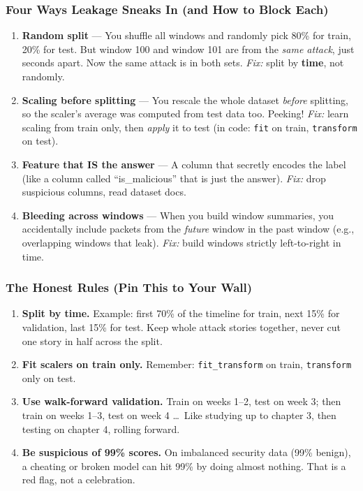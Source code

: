 \documentclass[11pt,a4paper]{article}
\begin{document}
\subsubsection{Four Ways Leakage Sneaks In (and How to Block Each)}

\begin{enumerate}[leftmargin=1.8em,itemsep=2pt]
  \item \textbf{Random split} --- You shuffle all windows and randomly pick
        80\% for train, 20\% for test. But window 100 and window 101 are from
the \emph{same attack}, just seconds apart. Now the same attack is in
both sets. \emph{Fix:} split by \textbf{time}, not randomly.

  \item \textbf{Scaling before splitting} --- You rescale the whole dataset
        \emph{before} splitting, so the scaler's average was computed from test
data too. Peeking! \emph{Fix:} learn scaling from train only, then
\emph{apply} it to test (in code: \texttt{fit} on train,
\texttt{transform} on test).

  \item \textbf{Feature that IS the answer} --- A column that secretly encodes
the label (like a column called ``is\_malicious'' that is just the
answer). \emph{Fix:} drop suspicious columns, read dataset docs.

  \item \textbf{Bleeding across windows} --- When you build window summaries,
you accidentally include packets from the \emph{future} window in the
past window (e.g., overlapping windows that leak). \emph{Fix:} build
windows strictly left-to-right in time.
\end{enumerate}

\subsubsection{The Honest Rules (Pin This to Your Wall)}

\begin{enumerate}[leftmargin=1.8em,itemsep=2pt]
  \item \textbf{Split by time.} Example: first 70\% of the timeline for train,
        next 15\% for validation, last 15\% for test. Keep whole attack stories
together, never cut one story in half across the split.
  \item \textbf{Fit scalers on train only.} Remember: \texttt{fit\_transform}
on train, \texttt{transform} only on test.
  \item \textbf{Use walk-forward validation.} Train on weeks 1--2, test on week
3; then train on weeks 1--3, test on week 4 \dots\ Like studying up to
chapter 3, then testing on chapter 4, rolling forward.
  \item \textbf{Be suspicious of 99\% scores.} On imbalanced security data
(99\% benign), a cheating or broken model can hit 99\% by doing almost
nothing. That is a red flag, not a celebration.
\end{enumerate}
\end{document}
